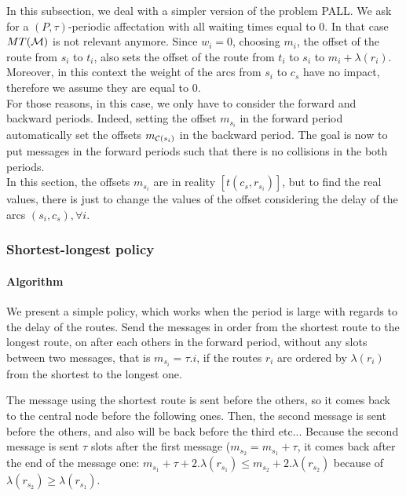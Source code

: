 \documentclass[a4paper,10pt]{article}
\begin{document}
  In this subsection, we deal with a simpler version of the problem PALL.
  We ask for a $(P,\tau)$-periodic affectation with all waiting times equal to $0$. 
  In that case $MT({\cal M})$ is not relevant anymore. Since $w_i=0$, choosing $m_i$, the offset of the route from
  $s_i$ to $t_i$, also sets the offset of the route from $t_i$ to $s_i$ to $m_i + \lambda(r_i)$.
  Moreover, in this context the weight of the arcs from $s_i$ to $c_s$ have no impact, therefore we assume they are 
  equal to $0$. \\
  For those reasons, in this case, we only have to consider the forward and backward periods. Indeed, setting the offset $m_{s_i}$ in the forward period automatically set the offsets $m_{{\cal C}(s_i)}$ in the backward period.
  The goal is now to put messages in the forward periods such that there is no collisions in the both periods.\\
  In this section, the offsets $m_{s_i}$ are in reality $[t(c_s,r_{s_i})]$, but to find the real values, there is just to change the values of the offset considering the delay of the arcs $(s_i, c_s) , \forall i$.
  
  
    \subsubsection{Shortest-longest policy}
    
    \paragraph{Algorithm}
    We present a simple policy, which works when the period is large with regards to the delay of the routes.
    Send the messages in order from the shortest route to the longest route, on after each others in the forward period, without any slots between two messages, that is $m_{s_i} = \tau.i$, if the routes $r_i$ are ordered by $\lambda(r_i)$ from the shortest to the longest one. 
      
      
The message using the shortest route is sent before the others, so it comes back to the central node before the following ones.
Then, the second message is sent before the others, and also will be back before the third etc... 
Because the second message is sent $\tau$ slots after the first message ($m_{s_2} = m_{s_1} + \tau$, it comes back after
the end of the message one: $m_{s_1}+ \tau + 2.\lambda(r_{s_1}) \le m_{s_2} + 2.\lambda(r_{s_2})$ because of $\lambda(r_{s_2}) \ge \lambda(r_{s_1})$.
\end{document}

